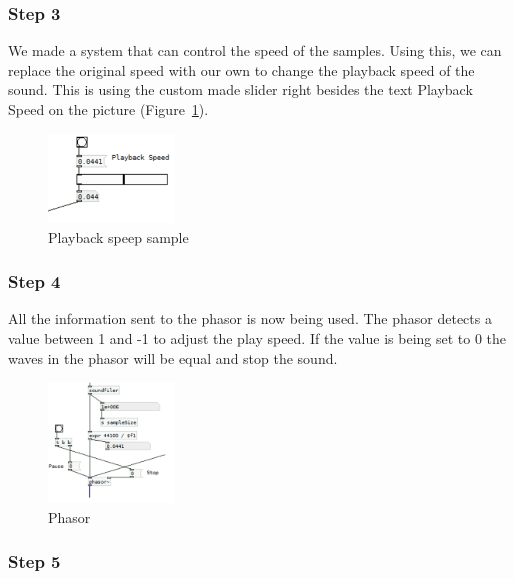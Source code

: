 \subsubsection*{Step 3} %
\label{ssub:step_3}

We made a system that can control the speed of the samples. 
Using this, we can replace the original speed with our own to change the playback speed of the sound. 
This is using the custom made slider right besides the text Playback Speed on the picture (Figure~\ref{fig:implementation5}).

\begin{figure}[!htbp]
    \centering
    \includegraphics[width=0.3\textwidth]{images/Implementation5.png}
    \caption{Playback speep sample}
    \label{fig:implementation5}
\end{figure}


\FloatBarrier
\subsubsection*{Step 4} %
\label{ssub:step_4}

All the information sent to the phasor is now being used. The phasor detects a value between 1 and -1 to adjust the play speed. If the value is being set to 0 the waves in the phasor will be equal and stop the sound.
\begin{figure}[!htbp]
    \centering
    \includegraphics[width=0.3\textwidth]{images/Implementation6.png}
    \caption{Phasor}
    \label{fig:implementation6}
\end{figure}


\FloatBarrier
\subsubsection*{Step 5} %
\label{ssub:step_5}

